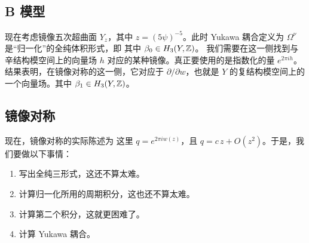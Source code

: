 \subsection{B 模型}
现在考虑镜像五次超曲面 $Y_z$，其中 $z=(5\psi)^{-5}$。此时 Yukawa 耦合定义为
$\Omega^\nu$ 是“归一化”的全纯体积形式，即
其中 $\beta_0\in H_3(Y,\mathbb Z)$。
我们需要在这一侧找到与辛结构模空间上的向量场 $h$ 对应的某种镜像。真正要使用的是指数化的量 $e^{2\pi i h}$。结果表明，在镜像对称的这一侧，它对应于 $\partial/\partial w$，也就是 $Y$ 的复结构模空间上的一个向量场。其中
$\beta_1\in H_3(Y,\mathbb Z)$。
\subsection{镜像对称}
现在，镜像对称的实际陈述为
这里 $q=e^{2\pi i w(z)}$，且 $q=c\,z+O(z^2)$。于是，我们要做以下事情：
\begin{enumerate}
\item 写出全纯三形式，这还不算太难。
\item 计算归一化所用的周期积分，这也还不算太难。
\item 计算第二个积分，这就更困难了。
\item 计算 Yukawa 耦合。
\end{enumerate}

